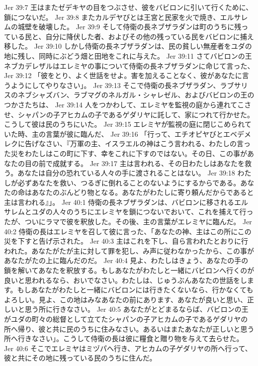 Jer 39:7  王はまたゼデキヤの目をつぶさせ、彼をバビロンに引いて行くために、鎖につないだ。
Jer 39:8  またカルデヤびとは王宮と民家を火で焼き、エルサレムの城壁を破壊した。
Jer 39:9  そして侍衛の長ネブザラダンは町のうちに残っている民と、自分に降伏した者、およびその他の残っている民をバビロンに捕え移した。
Jer 39:10  しかし侍衛の長ネブザラダンは、民の貧しい無産者をユダの地に残し、同時にぶどう畑と田地をこれに与えた。
Jer 39:11  さてバビロンの王ネブカデレザルはエレミヤの事について侍衛の長ネブザラダンに命じて言った、
Jer 39:12  「彼をとり、よく世話をせよ。害を加えることなく、彼があなたに言うようにしてやりなさい」。
Jer 39:13  そこで侍衛の長ネブザラダン、ラブサリスのネブシャズバン、ラブマグのネルガル・シャレゼル、およびバビロンの王のつかさたちは、
Jer 39:14  人をつかわして、エレミヤを監視の庭から連れてこさせ、シャパンの子アヒカムの子であるゲダリヤに託して、家につれて行かせた。こうして彼は民のうちにいた。
Jer 39:15  エレミヤが監視の庭に閉じこめられていた時、主の言葉が彼に臨んだ、
Jer 39:16  「行って、エチオピヤびとエベデメレクに告げなさい、『万軍の主、イスラエルの神はこう言われる、わたしの言った災をわたしはこの町に下す、幸をこれに下すのではない。その日、この事があなたの目の前で成就する。
Jer 39:17  主は言われる、その日わたしはあなたを救う。あなたは自分の恐れている人々の手に渡されることはない。
Jer 39:18  わたしが必ずあなたを救い、つるぎに倒れることのないようにするからである。あなたの命はあなたのぶんどり物となる。あなたがわたしに寄り頼んだからであると主は言われる』」。
Jer 40:1  侍衛の長ネブザラダンは、バビロンに移されるエルサレムとユダの人々のうちにエレミヤを鎖につないでおいて、これを捕えて行ったが、ついにラマで彼を釈放した。その後、主の言葉がエレミヤに臨んだ。
Jer 40:2  侍衛の長はエレミヤを召して彼に言った、「あなたの神、主はこの所にこの災を下すと告げ示された。
Jer 40:3  主はこれを下し、自ら言われたとおりに行われた。あなたがたが主に対して罪を犯し、み声に従わなかったから、この事があなたがたの上に臨んだのだ。
Jer 40:4  見よ、わたしはきょう、あなたの手の鎖を解いてあなたを釈放する。もしあなたがわたしと一緒にバビロンへ行くのが良いと思われるなら、おいでなさい。わたしは、じゅうぶんあなたの世話をします。もしあなたがわたしと一緒にバビロンには行きたくないなら、行かなくてもよろしい。見よ、この地はみなあなたの前にあります、あなたが良いと思い、正しいと思う所に行きなさい。
Jer 40:5  あなたがとどまるならば、バビロンの王がユダの町々の総督として立てたシャパンの子アヒカムの子であるゲダリヤの所へ帰り、彼と共に民のうちに住みなさい。あるいはまたあなたが正しいと思う所へ行きなさい」。こうして侍衛の長は彼に糧食と贈り物を与えて去らせた。
Jer 40:6  そこでエレミヤはミヅパへ行き、アヒカムの子ゲダリヤの所へ行って、彼と共にその地に残っている民のうちに住んだ。

